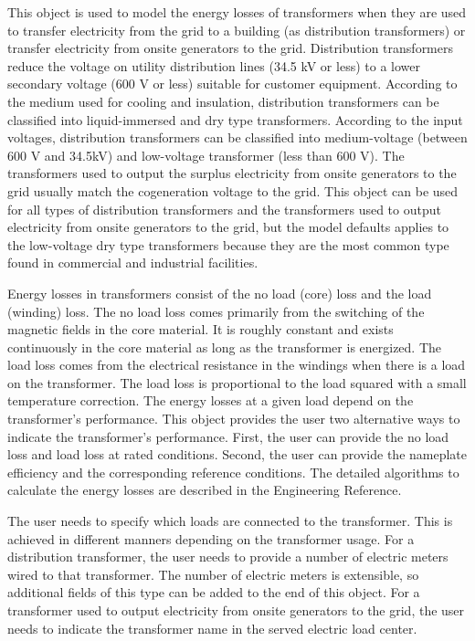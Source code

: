 This object is used to model the energy losses of transformers when they are used to transfer electricity from the grid to a building (as distribution transformers) or transfer electricity from onsite generators to the grid. Distribution transformers reduce the voltage on utility distribution lines (34.5 kV or less) to a lower secondary voltage (600 V or less) suitable for customer equipment. According to the medium used for cooling and insulation, distribution transformers can be classified into liquid-immersed and dry type transformers. According to the input voltages, distribution transformers can be classified into medium-voltage (between 600 V and 34.5kV) and low-voltage transformer (less than 600 V). The transformers used to output the surplus electricity from onsite generators to the grid usually match the cogeneration voltage to the grid. This object can be used for all types of distribution transformers and the transformers used to output electricity from onsite generators to the grid, but the model defaults applies to the low-voltage dry type transformers because they are the most common type found in commercial and industrial facilities.

Energy losses in transformers consist of the no load (core) loss and the load (winding) loss. The no load loss comes primarily from the switching of the magnetic fields in the core material. It is roughly constant and exists continuously in the core material as long as the transformer is energized. The load loss comes from the electrical resistance in the windings when there is a load on the transformer. The load loss is proportional to the load squared with a small temperature correction. The energy losses at a given load depend on the transformer's performance. This object provides the user two alternative ways to indicate the transformer's performance. First, the user can provide the no load loss and load loss at rated conditions. Second, the user can provide the nameplate efficiency and the corresponding reference conditions. The detailed algorithms to calculate the energy losses are described in the Engineering Reference.

The user needs to specify which loads are connected to the transformer. This is achieved in different manners depending on the transformer usage. For a distribution transformer, the user needs to provide a number of electric meters wired to that transformer. The number of electric meters is extensible, so additional fields of this type can be added to the end of this object.  For a transformer used to output electricity from onsite generators to the grid, the user needs to indicate the transformer name in the served electric load center.

